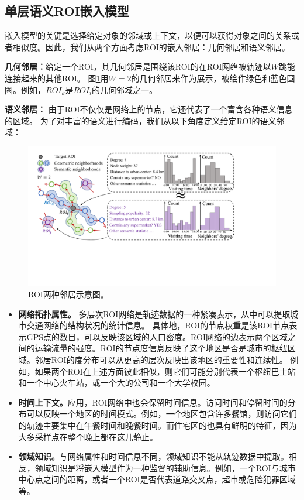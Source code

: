 \subsection{单层语义ROI嵌入模型}
嵌入模型的关键是选择给定对象的邻域或上下文，以便可以获得对象之间的关系或者相似度。因此，我们从两个方面考虑ROI的嵌入邻居：几何邻居和语义邻居。

\vspace{2mm}
\textbf{几何邻居：}给定一个ROI，其几何邻居是围绕该ROI的在ROI网络被轨迹以$W$跳能连接起来的其他ROI。 图\ref{fig:context}用$W =2$的几何邻居来作为展示，被绘作绿色和蓝色圆圈。例如，${ROI}_k $是$ {ROI} _i $的几何邻域之一。

\vspace{2mm}
\textbf{语义邻居：} 由于ROI不仅仅是网络上的节点，它还代表了一个富含各种语义信息的区域。 为了对丰富的语义进行编码，我们从以下角度定义给定ROI的语义邻域：

\tabcolsep=1pt
\begin{figure}[!t]
\centering
\includegraphics[width=130mm]{pics/embedding.pdf}
\caption {ROI两种邻居示意图。}
\label{fig:context}
\end{figure}

\begin{itemize}
\item \textbf{网络拓扑属性。} 多层次ROI网络是轨迹数据的一种紧凑表示，从中可以提取城市交通网络的结构状况的统计信息。 具体地，ROI的节点权重是该ROI节点表示GPS点的数目，可以反映该区域的人口密度。ROI网络的边表示两个区域之间的运输流量的强度。ROI的节点度信息反映了这个地区是否是城市的枢纽区域。邻居ROI的度分布可以从更高的层次反映出该地区的重要性和连续性。 例如，如果两个ROI在上述方面彼此相似，则它们可能分别代表一个枢纽巴士站和一个中心火车站，或一个大的公司和一个大学校园。

\item \textbf{时间上下文。}应用，ROI网络中也会保留时间信息。访问时间和停留时间的分布可以反映一个地区的时间模式。例如，一个地区包含许多餐馆，则访问它们的轨迹主要集中在午餐时间和晚餐时间。而住宅区的也具有鲜明的特征，因为大多采样点在整个晚上都在这儿静止。

\item \textbf{领域知识。}与网络属性和时间信息不同，领域知识不能从轨迹数据中提取。相反，领域知识是将嵌入模型作为一种监督的辅助信息。例如，一个ROI与城市中心点之间的距离，或者一个ROI是否代表道路交叉点，超市或危险犯罪区域等。
\end{itemize}




